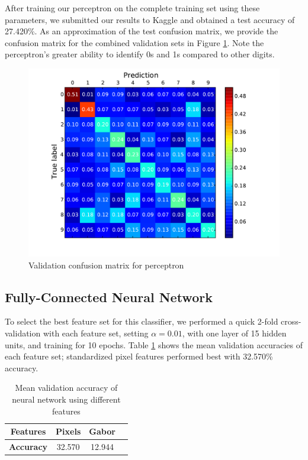 \documentclass{acm_proc_article-sp}
\begin{document}
After training our perceptron on the complete training set using these parameters, we submitted our results to Kaggle and obtained a test accuracy of 27.420\%. As an approximation of the test confusion matrix, we provide the confusion matrix for the combined validation sets in Figure \ref{fig:perc-confusion}. Note the perceptron's greater ability to identify 0s and 1s compared to other digits.
\begin{figure}[h!]
	\centering
	\includegraphics[width=\linewidth]{perceptron_confusion}
  	\caption{Validation confusion matrix for perceptron}
  	\label{fig:perc-confusion}
\end{figure}

\subsection{Fully-Connected Neural Network}
To select the best feature set for this classifier, we performed a quick 2-fold cross-validation with each feature set, setting $\alpha = 0.01$, with one layer of 15 hidden units, and training for 10 epochs. Table \ref{tab:nn-features} shows the mean validation accuracies of each feature set; standardized pixel features performed best with 32.570\% accuracy.

\begin{table}[h!]
  \centering
  \begin{tabular}{|c||c|c|c| }
    \hline
    {\bfseries Features} & Pixels & Gabor \\
    \hline
    {\bfseries Accuracy} & 32.570 & 12.944 \\
    \hline
  \end{tabular}
  \caption{Mean validation accuracy of neural network using different features}
  \label{tab:nn-features}
\end{table}
\end{document}
